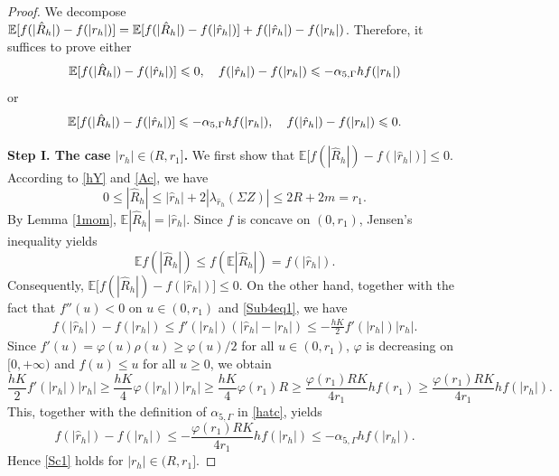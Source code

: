 \documentclass[aap]{imsart}
\theoremstyle{plain}
\theoremstyle{definition}
\begin{document}
\begin{proof}
We decompose \(\mathbb{E}[f(|\hat{R}_h|)-f(|r_h|)] = \mathbb{E}[f(|\hat{R}_h|)-f(|\hat{r}_h|)] + f(|\hat{r}_h|)-f(|r_h|)\). Therefore, it suffices to prove either 
\begin{equation}\label{Sc1}
\mathbb{E}[f(|\hat{R}_h|)-f(|\hat{r}_h|)]\leqslant 0,\quad f(|\hat{r}_h|)-f(|r_h|)\leqslant -\alpha_{5, \Gamma} hf(|r_h|)
\end{equation}
or
\begin{equation}\label{Sc2}
\mathbb{E}[f(|\hat{R}_h|)-f(|\hat{r}_h|)]\leqslant-\alpha_{5, \Gamma} hf(|r_h|), \quad f(|\hat{r}_h|)-f(|r_h|)\leqslant 0.	
\end{equation}
				
{\bf Step I. The case $|r_h|\in(R,r_1]$.} We first show that \(\mathbb E\bigl[f(|\hat R_h|)-f(|\hat r_h|)\bigr]\leqslant 0\).
According to \eqref{hY} and \eqref{Ac}, we have 
\[0\leqslant |\hat{R}_h|\leqslant |\hat{r}_h|+2|\lambda_{\hat r_h}(\Sigma Z)|\leqslant 2R+2m=r_1.\] 
By Lemma \ref{1mom}, \(\mathbb E|\hat R_h|=|\hat r_h|\).
Since $f$ is concave on $(0,r_1)$, Jensen's inequality yields
\[\mathbb E f(|\hat R_h|)
\leqslant f(\mathbb E|\hat R_h|)=f(|\hat r_h|).\]
Consequently, \(\mathbb E\bigl[f(|\hat R_h|)-f(|\hat r_h|)\bigr]\leqslant 0\). On the other hand, together with the fact that $f''(u)< 0$ on $u\in(0, r_1)$ and \eqref{Sub4eq1}, we have
\begin{align*}
f(|\hat{r}_h|)-f(|r_h|)\leqslant f'(|r_h|)(|\hat{r}_h|-|r_h|)\leqslant -\frac{hK}{2}f'(|r_h|)|r_h|.
\end{align*}
Since $f'(u)= \varphi(u)\rho(u)\geqslant \varphi(u)/2$ for all $u\in(0, r_1)$, $\varphi$ is decreasing on $[0, +\infty)$ and $f(u)\leqslant u$ for all $u\geqslant 0$, we obtain
$$\frac{hK}{2}f'(|r_h|)|r_h|\geqslant \frac{hK}{4}\varphi(|r_h|)|r_h|\geqslant \frac{hK}{4}\varphi(r_1)R\geqslant \frac{\varphi(r_1)R K}{4r_1}hf(r_1)\geqslant \frac{\varphi(r_1)R K}{4r_1}hf(|r_h|).$$ 
This, together with the definition of $\alpha_{5, \Gamma}$ in \eqref{hatc}, yields
\begin{equation*}
f(|\hat{r}_h|)-f(|r_h|) \leqslant -\frac{\varphi(r_1)R K}{4r_1}hf(|r_h|)\leqslant -\alpha_{5, \Gamma}hf(|r_h|).
\end{equation*}
Hence \eqref{Sc1} holds for $|r_h|\in(R,r_1]$.
				

\end{proof}
\end{document}
